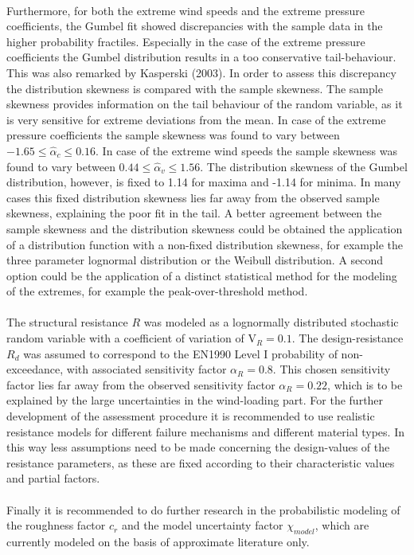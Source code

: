 \\
Furthermore, for both the extreme wind speeds and the extreme pressure coefficients, the Gumbel fit showed discrepancies with the sample data in the higher probability fractiles. Especially in the case of the extreme pressure coefficients the Gumbel distribution results in a too conservative tail-behaviour. This was also remarked by Kasperski (2003).
In order to assess this discrepancy the distribution skewness is compared with the sample skewness. The sample skewness provides information on the tail behaviour of the random variable, as it is very sensitive for extreme deviations from the mean. In case of the extreme pressure coefficients the sample skewness was found to vary between $-1.65 \leq \hat{\alpha}_c \leq 0.16$. In case of the extreme wind speeds the sample skewness was found to vary between $0.44 \leq \hat{\alpha}_v \leq 1.56$. The  distribution skewness of the Gumbel distribution, however, is fixed to 1.14 for maxima and -1.14 for minima. In many cases this fixed distribution skewness lies far away from the observed sample skewness, explaining the poor fit in the tail.
A better agreement between the sample skewness and the distribution skewness could be obtained the application of a distribution function with a non-fixed distribution skewness, for example the three parameter lognormal distribution or the Weibull distribution. A second option could be the application of a distinct statistical method for the modeling of the extremes, for example the peak-over-threshold method.\\
\\
The structural resistance $R$ was modeled as a lognormally distributed stochastic random variable with a coefficient of variation of $\text{V}_R=0.1$. The design-resistance $R_d$ was assumed to correspond to the EN1990 Level I probability of non-exceedance, with associated sensitivity factor $\alpha_R=0.8$. This chosen sensitivity factor lies far away from the observed sensitivity factor  $\alpha_R=0.22$, which is to be explained by the large uncertainties in the wind-loading part.
For the further development of the assessment procedure it is  recommended to use realistic resistance models for different failure mechanisms and different material types. In this way less assumptions need to be made concerning the design-values of the resistance parameters, as these are fixed according to their characteristic values and partial factors. \\
\\
Finally it is recommended to do further research in the probabilistic modeling of the roughness factor $c_r$ and the model uncertainty factor $\chi_{model}$, which are currently modeled on the basis of approximate literature only. 

